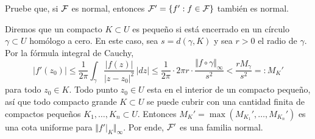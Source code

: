 \begin{exercise}
Pruebe que, si $\mathcal F$ es normal, entonces $\mathcal F' = \{ f' : f \in \mathcal F \}$ también es normal.
\end{exercise}

\begin{solution}
Diremos que un compacto $K \subset U$ es pequeño si está encerrado en un círculo $\gamma \subset U$ homólogo a cero. En este caso, sea $s = d(\gamma, K)$ y sea $r > 0$ el radio de $\gamma$. Por la fórmula integral de Cauchy,
$$
|f'(z_0)|
    \le \frac 1 {2\pi} \int_\gamma \frac {|f(z)|} {|z - z_0|^2} \, |dz|
    \le \frac 1 {2\pi} \cdot 2\pi r \cdot \frac {\Vert f \circ \gamma \Vert_\infty} {s^2}
    < \frac {rM_\gamma} {s^2} =: M_K'
$$
para todo $z_0 \in K$. Todo punto $z_0 \in U$ esta en el interior de un compacto pequeño, así que todo compacto grande $K \subset U$ se puede cubrir con una cantidad finita de compactos pequeños $K_1, \dots, K_n \subset U$. Entonces $M_K' = \max(M_{K_1}', \dots, M_{K_n}')$ es una cota uniforme para $\Vert f'|_K \Vert_\infty$. Por ende, $\mathcal F'$ es una familia normal.
\end{solution}
